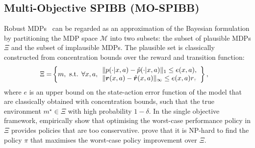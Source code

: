 


\subsection{Multi-Objective SPIBB (MO-SPIBB)}
\label{sec:spibb-w-constraints}

Robust MDPs~\citep{Iyengar2005,Nilim2005} can be regarded as an approximation of the Bayesian formulation by partitioning the MDP space $\mathcal{M}$ into two subsets: the subset of plausible MDPs $\Xi$  and the subset of implausible MDPs. The plausible set is classically constructed from concentration bounds over the reward and transition function:
\begin{align*}
    \Xi = &\left\{m,
	\textnormal{ s.t. } \forall x,a, 
	\begin{array}{ll}
	\lVert p(\cdot|x,a)-\hat{p}(\cdot|x,a)\rVert_1 \leq e(x,a),\\
	\lVert \bm{r}(x,a)-\hat{\bm{r}}(x,a)\rVert_\infty \leq e(x,a)r_{\mytop} \end{array}\right\},
\end{align*}
where $e$ is an upper bound on the state-action error function of the model that are classically obtained with concentration bounds, such that the true environment $m^{\star}\in\Xi$ with high probability $1-\delta$.
%
In the single objective framework, \citet{laroche2017safe} empirically show that optimising the worst-case performance policy in $\Xi$ provides policies that are too conservative. \citet{petrik2016safe} prove that it is NP-hard to find the policy $\pi$ that maximises the worst-case policy improvement over $\Xi$. 

